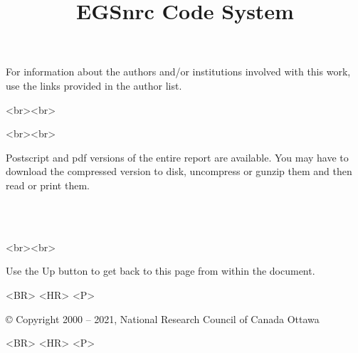 \documentclass[12pt,twoside]{article}  %
\begin{document}
\begin{htmlonly}
For information about the authors and/or institutions involved with this
work, use the links provided in the author list.\\
\begin{rawhtml}
<br><br>
\end{rawhtml}


\begin{rawhtml}
<br><br>
\end{rawhtml}

Postscript and pdf versions of the entire report are available.  You may have to
download the compressed version to disk, uncompress or gunzip them and
then read or print them.\\
\begin{center}
\\
\\
\end{center}
\begin{rawhtml}
<br><br>
\end{rawhtml}

Use the Up button to get back to this page from within the document.
\begin{rawhtml}
<BR> <HR> <P>
\end{rawhtml}
\copyright
Copyright 2000 -- 2021, National Research Council of Canada
Ottawa
\begin{rawhtml}
<BR> <HR> <P>
\end{rawhtml}
\end{htmlonly}

\pagestyle{empty}



\title{EGSnrc Code System}
\end{document}

